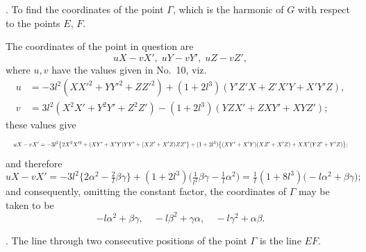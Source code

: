\documentclass[11pt]{article}
\begin{document}
\medskip

. To find the coordinates of the point $\Gamma$, which is the harmonic of $G$ with respect to the points $E$, $F$.

The coordinates of the point in question are
\[
u X - v X',\; u Y - v Y',\; u Z - v Z',
\]
where $u, v$ have the values given in No.~10, viz.
\begin{align*}
u &= -3 l^2 (X X'^2 + Y Y'^2 + Z Z'^2) + (1 + 2 l^3)(Y' Z' X + Z' X' Y + X' Y' Z), \\
v &=  3 l^2 (X^2 X' + Y^2 Y' + Z^2 Z') - (1 + 2 l^3)(Y Z X' + Z X Y' + X Y Z');
\end{align*}
these values give
\[
\resizebox{\textwidth}{!}{$\displaystyle u X - v X' = -3 l^2 \bigl\{ 2 X^2 X'^2 + (X Y' + X' Y) Y Y' + (X Z' + X' Z) Z Z' \bigr\} + (1 + 2 l^3)\bigl\{(X Y' + X' Y)(X Z' + X' Z) + X X' (Y Z' + Y' Z)\bigr\};$}
\]
and therefore
\[
u X - v X' = -3 l^2 \bigl\{ 2 \alpha^2 - \tfrac{2}{l}\beta\gamma\bigr\} + (1 + 2 l^3)\bigl(\tfrac{1}{l^2}\beta\gamma - \tfrac{1}{l}\alpha^2\bigr) = \tfrac{1}{l}(1 + 8 l^3)\bigl(-l\alpha^2 + \beta\gamma\bigr);
\]
and consequently, omitting the constant factor, the coordinates of $\Gamma$ may be taken to be
\[
-l\alpha^2 + \beta\gamma,\quad -l\beta^2 + \gamma\alpha,\quad -l\gamma^2 + \alpha\beta.
\]

\medskip

. The line through two consecutive positions of the point $\Gamma$ is the line $EF$.
\end{document}
